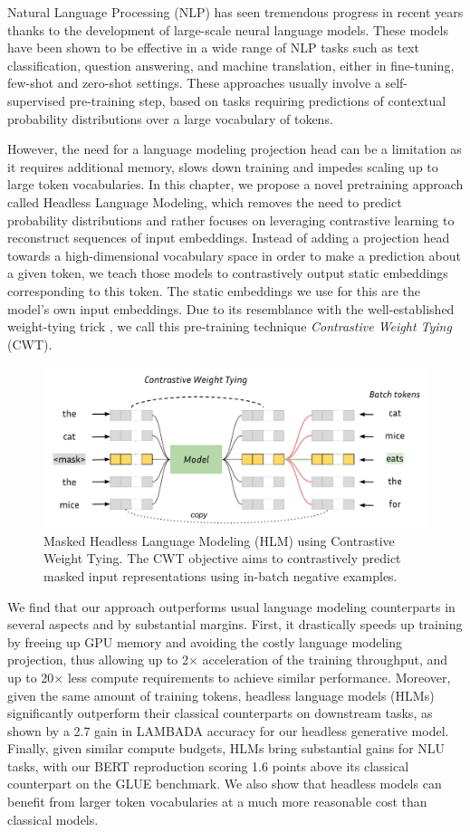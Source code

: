 
Natural Language Processing (NLP) has seen tremendous progress in recent years thanks to the development of large-scale neural language models. These models have been shown to be effective in a wide range of NLP tasks such as text classification, question answering, and machine translation, either in fine-tuning, few-shot and zero-shot settings. These approaches usually involve a self-supervised pre-training step, based on tasks requiring predictions of contextual probability distributions over a large vocabulary of tokens.

However, the need for a language modeling projection head can be a limitation as it requires additional memory, slows down training and impedes scaling up to large token vocabularies. In this chapter, we propose a novel pretraining approach called Headless Language Modeling, which removes the need to predict probability distributions and rather focuses on leveraging contrastive learning to reconstruct sequences of input embeddings. Instead of adding a projection head towards a high-dimensional vocabulary space in order to make a prediction about a given token, we teach those models to contrastively output static embeddings corresponding to this token. The static embeddings we use for this are the model's own input embeddings. Due to its resemblance with the well-established weight-tying trick \citep{press-wolf-2017-using,he2023debertav3}, we call this pre-training technique \textit{Contrastive Weight Tying} (CWT).

\begin{figure}[h]
    \centering
    \includegraphics[width=0.6\linewidth]{sources/part_2/headless/imgs/hlm_basic.pdf}
    \caption{Masked Headless Language Modeling (HLM) using Contrastive Weight Tying. The CWT objective aims to contrastively predict masked input representations using in-batch negative examples.}
    \label{fig:cwt_schema}
\end{figure}

We find that our approach outperforms usual language modeling counterparts in several aspects and by substantial margins. First, it drastically speeds up training by freeing up GPU memory and avoiding the costly language modeling projection, thus allowing up to 2$\times$ acceleration of the training throughput, and up to 20$\times$ less compute requirements to achieve similar performance. Moreover, given the same amount of training tokens, headless language models (HLMs) significantly outperform their classical counterparts on downstream tasks, as shown by a 2.7 gain in LAMBADA accuracy for our headless generative model. Finally, given similar compute budgets, HLMs bring substantial gains for NLU tasks, with our BERT reproduction scoring 1.6 points above its classical counterpart on the GLUE benchmark. We also show that headless models can benefit from larger token vocabularies at a much more reasonable cost than classical models.


